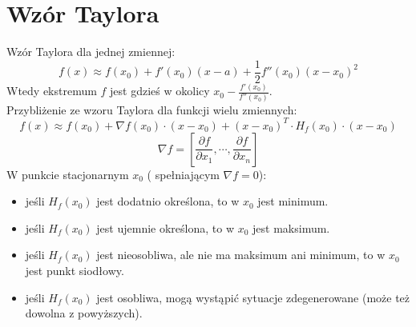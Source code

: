 \section{Wzór Taylora}
Wzór Taylora dla jednej zmiennej:
\[
    f(x) \approx f(x_0) + f'(x_0)(x - a) + \frac{1}{2}f''(x_0)(x - x_0)^2
\]
Wtedy ekstremum \( f \) jest gdzieś w okolicy \( x_0 - \frac{f'(x_0)}{f''(x_0)} \). \\
Przybliżenie ze wzoru Taylora dla funkcji wielu zmiennych:
\[
    f(x) \approx f(x_0) + \nabla f(x_0) \cdot (x - x_0) + (x - x_0)^T \cdot H_f(x_0) \cdot (x - x_0)
\]
\[
    \nabla f = \left[ \frac{\partial f}{\partial x_1}, \cdots, \frac{\partial f}{\partial x_n} \right]
\]
W punkcie stacjonarnym \( x_0 \) ( spełniającym \( \nabla f = 0 \)):
\begin{itemize}
\onehalfspacing
    \item jeśli \( H_f(x_0) \) jest dodatnio określona, to w \( x_0 \) jest minimum.
    \item jeśli \( H_f(x_0) \) jest ujemnie określona, to w \( x_0 \) jest maksimum.
    \item jeśli \( H_f(x_0) \) jest nieosobliwa, ale nie ma maksimum ani minimum, to w \( x_0 \) jest punkt siodłowy.
    \item jeśli \( H_f(x_0) \) jest osobliwa, mogą wystąpić sytuacje zdegenerowane (może też dowolna \linebreak z powyższych).
\end{itemize}